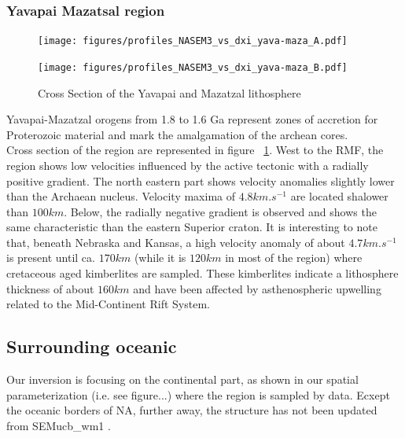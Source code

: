 \documentclass[12pt]{article}
\begin{document}
\subsubsection{Yavapai Mazatsal region}
	\begin{figure}[h]
		\begin{minipage}{0.5\linewidth}
			\centerline{\texttt{[image: figures/profiles\_NASEM3\_vs\_dxi\_yava-maza\_A.pdf]}}
		\end{minipage}
		\hfill
		\begin{minipage}{0.5\linewidth}
			\centerline{\texttt{[image: figures/profiles\_NASEM3\_vs\_dxi\_yava-maza\_B.pdf]}}
		\end{minipage}

		\caption{Cross Section of the Yavapai and Mazatzal lithosphere}
		\label{yavacross}

	\end{figure}


	Yavapai-Mazatzal orogens from 1.8 to 1.6 Ga represent zones of accretion for Proterozoic material and mark the amalgamation of the archean cores. \citep{hoffman1988united} \\
	Cross section of the region are represented in figure ~\ref{yavacross}.
	West to the RMF, the region shows low velocities influenced by the active tectonic with a radially positive gradient. 
	The north eastern part shows velocity anomalies slightly lower than the Archaean nucleus. Velocity maxima of $4.8km.s^{-1}$ are located shalower than $100km$. 
	Below, the radially negative gradient is observed and shows the same characteristic than the eastern Superior craton. It is interesting to note that, beneath Nebraska and Kansas, a high velocity anomaly of about $4.7km.s^{-1}$ is present until ca. $170km$ (while it is $120km$ in most of the region) where cretaceous aged kimberlites are sampled. 
	These kimberlites indicate a lithosphere thickness of about $160km$ and have been affected by asthenospheric upwelling related to the Mid-Continent Rift System. \citep{griffin2004lithosphere}





\subsection{Surrounding oceanic}
	Our inversion is focusing on the continental part, as shown in our spatial parameterization (i.e. see figure...) where the region is sampled by data.
	Ecxept the oceanic borders of NA, further away, the structure has not been updated from SEMucb\_wm1 \citep{french2014whole}. 
\end{document}
